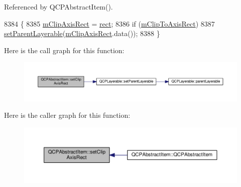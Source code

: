 Referenced by Q\+C\+P\+Abstract\+Item().


\begin{DoxyCode}
8384 \{
8385   \hyperlink{class_q_c_p_abstract_item_a3e57cfe7da4b1ac3d6fa7281ea437361}{mClipAxisRect} = \hyperlink{_gen_blob_8m_aea8f6815d9a63491fc422c5572c6b3c3}{rect};
8386   \textcolor{keywordflow}{if} (\hyperlink{class_q_c_p_abstract_item_ad2a70ff6b658fcb84a9427f69d3f587d}{mClipToAxisRect})
8387     \hyperlink{class_q_c_p_layerable_aa23c893671f1f6744ac235cf2204cf3a}{setParentLayerable}(\hyperlink{class_q_c_p_abstract_item_a3e57cfe7da4b1ac3d6fa7281ea437361}{mClipAxisRect}.data());
8388 \}
\end{DoxyCode}


Here is the call graph for this function\+:\nopagebreak
\begin{figure}[H]
\begin{center}
\leavevmode
\includegraphics[width=350pt]{class_q_c_p_abstract_item_a7dc75fcbcd10206fe0b75d757ea7a347_cgraph}
\end{center}
\end{figure}




Here is the caller graph for this function\+:\nopagebreak
\begin{figure}[H]
\begin{center}
\leavevmode
\includegraphics[width=350pt]{class_q_c_p_abstract_item_a7dc75fcbcd10206fe0b75d757ea7a347_icgraph}
\end{center}
\end{figure}


\hypertarget{class_q_c_p_abstract_item_a39e05b9d4176b9accafc746d16ca6a06}{}
